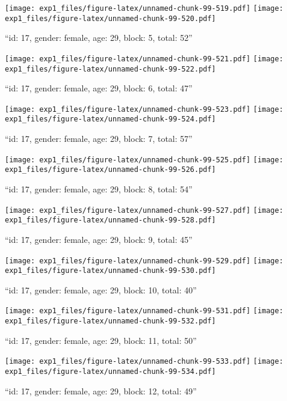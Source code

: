 \documentclass[,]{article}
\begin{document}
\texttt{[image: exp1\_files/figure-latex/unnamed-chunk-99-519.pdf]}
\texttt{[image: exp1\_files/figure-latex/unnamed-chunk-99-520.pdf]}

\newpage
[1] 

``id: 17, gender: female, age: 29, block: 5, total: 52''

\texttt{[image: exp1\_files/figure-latex/unnamed-chunk-99-521.pdf]}
\texttt{[image: exp1\_files/figure-latex/unnamed-chunk-99-522.pdf]}

\newpage
[1] 

``id: 17, gender: female, age: 29, block: 6, total: 47''

\texttt{[image: exp1\_files/figure-latex/unnamed-chunk-99-523.pdf]}
\texttt{[image: exp1\_files/figure-latex/unnamed-chunk-99-524.pdf]}

\newpage
[1] 

``id: 17, gender: female, age: 29, block: 7, total: 57''

\texttt{[image: exp1\_files/figure-latex/unnamed-chunk-99-525.pdf]}
\texttt{[image: exp1\_files/figure-latex/unnamed-chunk-99-526.pdf]}

\newpage
[1] 

``id: 17, gender: female, age: 29, block: 8, total: 54''

\texttt{[image: exp1\_files/figure-latex/unnamed-chunk-99-527.pdf]}
\texttt{[image: exp1\_files/figure-latex/unnamed-chunk-99-528.pdf]}

\newpage
[1] 

``id: 17, gender: female, age: 29, block: 9, total: 45''

\texttt{[image: exp1\_files/figure-latex/unnamed-chunk-99-529.pdf]}
\texttt{[image: exp1\_files/figure-latex/unnamed-chunk-99-530.pdf]}

\newpage
[1] 

``id: 17, gender: female, age: 29, block: 10, total: 40''

\texttt{[image: exp1\_files/figure-latex/unnamed-chunk-99-531.pdf]}
\texttt{[image: exp1\_files/figure-latex/unnamed-chunk-99-532.pdf]}

\newpage
[1] 

``id: 17, gender: female, age: 29, block: 11, total: 50''

\texttt{[image: exp1\_files/figure-latex/unnamed-chunk-99-533.pdf]}
\texttt{[image: exp1\_files/figure-latex/unnamed-chunk-99-534.pdf]}

\newpage
[1] 

``id: 17, gender: female, age: 29, block: 12, total: 49''
\end{document}
